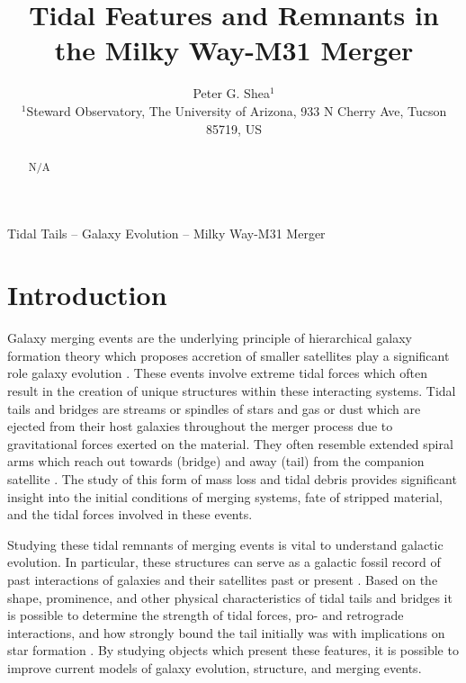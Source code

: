 \documentclass[fleqn,usenatbib]{mnras}
\title[Short title, max. 45 characters]{Tidal Features and Remnants in the Milky Way-M31 Merger}
\author[P. G. Shea]{
Peter G. Shea$^{1}$
\\
$^{1}$Steward Observatory, The University of Arizona, 933 N Cherry Ave, Tucson 85719, US\\
}
\begin{document}
\label{firstpage}
\pagerange{\pageref{firstpage}--\pageref{lastpage}}
\maketitle

\begin{abstract}
N/A
\end{abstract}

\begin{keywords}
Tidal Tails -- Galaxy Evolution -- Milky Way-M31 Merger
\end{keywords}



\section{Introduction}


Galaxy merging events are the underlying principle of hierarchical galaxy formation theory which proposes accretion of smaller satellites play a significant role galaxy evolution \cite{Wang_Hammer_Athanassoula_Puech_Yang_Flores_2012}. 
These events involve extreme tidal forces which often result in the creation of unique structures within these interacting systems. 
Tidal tails and bridges are streams or spindles of stars and gas or dust which are ejected from their host galaxies throughout the merger process due to gravitational forces exerted on the material. 
They often resemble extended spiral arms which reach out towards (bridge) and away (tail) from the companion satellite \cite{Toomre_Toomre_1972}. 
The study of this form of mass loss and tidal debris provides significant insight into the initial conditions of merging systems, fate of stripped material, and the tidal forces involved in these events.


Studying these tidal remnants of merging events is vital to understand galactic evolution. In particular, these structures can serve as a galactic fossil record of past interactions of galaxies and their satellites past or present \cite{Wang_Hammer_Athanassoula_Puech_Yang_Flores_2012}.  
Based on the shape, prominence, and other physical characteristics of tidal tails and bridges it is possible to determine the strength of tidal forces, pro- and retrograde interactions, and how strongly bound the tail initially was with implications on star formation \cite{Privon_Barnes_Evans_Hibbard_Yun_Mazzarella_Armus_Surace_2013}. 
By studying objects which present these features, it is possible to improve current models of galaxy evolution, structure, and merging events. 
\end{document}
